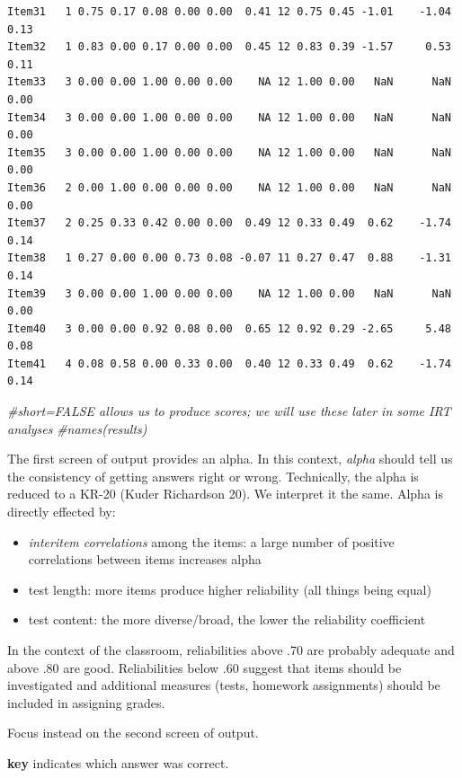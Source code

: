 \documentclass[
  english,
]{book}
\newenvironment{Shaded}{\begin{snugshade}}{\end{snugshade}}
\newcommand{\CommentTok}[1]{\textcolor[rgb]{0.56,0.35,0.01}{\textit{#1}}}
\providecommand{\tightlist}{%
  \setlength{\itemsep}{0pt}\setlength{\parskip}{0pt}}
\begin{document}
\begin{verbatim}
Item31   1 0.75 0.17 0.08 0.00 0.00  0.41 12 0.75 0.45 -1.01    -1.04 0.13
Item32   1 0.83 0.00 0.17 0.00 0.00  0.45 12 0.83 0.39 -1.57     0.53 0.11
Item33   3 0.00 0.00 1.00 0.00 0.00    NA 12 1.00 0.00   NaN      NaN 0.00
Item34   3 0.00 0.00 1.00 0.00 0.00    NA 12 1.00 0.00   NaN      NaN 0.00
Item35   3 0.00 0.00 1.00 0.00 0.00    NA 12 1.00 0.00   NaN      NaN 0.00
Item36   2 0.00 1.00 0.00 0.00 0.00    NA 12 1.00 0.00   NaN      NaN 0.00
Item37   2 0.25 0.33 0.42 0.00 0.00  0.49 12 0.33 0.49  0.62    -1.74 0.14
Item38   1 0.27 0.00 0.00 0.73 0.08 -0.07 11 0.27 0.47  0.88    -1.31 0.14
Item39   3 0.00 0.00 1.00 0.00 0.00    NA 12 1.00 0.00   NaN      NaN 0.00
Item40   3 0.00 0.00 0.92 0.08 0.00  0.65 12 0.92 0.29 -2.65     5.48 0.08
Item41   4 0.08 0.58 0.00 0.33 0.00  0.40 12 0.33 0.49  0.62    -1.74 0.14
\end{verbatim}

\begin{Shaded}
\begin{Highlighting}[]
\CommentTok{\#short=FALSE allows us to produce scores; we will use these later in some IRT analyses}
\CommentTok{\#names(results)}
\end{Highlighting}
\end{Shaded}

The first screen of output provides an alpha. In this context, \emph{alpha} should tell us the consistency of getting answers right or wrong. Technically, the alpha is reduced to a KR-20 (Kuder Richardson 20). We interpret it the same. Alpha is directly effected by:

\begin{itemize}
\tightlist
\item
  \emph{interitem correlations} among the items: a large number of positive correlations between items increases alpha
\item
  test length: more items produce higher reliability (all things being equal)
\item
  test content: the more diverse/broad, the lower the reliability coefficient
\end{itemize}

In the context of the classroom, reliabilities above .70 are probably adequate and above .80 are good. Reliabilities below .60 suggest that items should be investigated and additional measures (tests, homework assignments) should be included in assigning grades.

Focus instead on the second screen of output.

\textbf{key} indicates which answer was correct.
\end{document}
